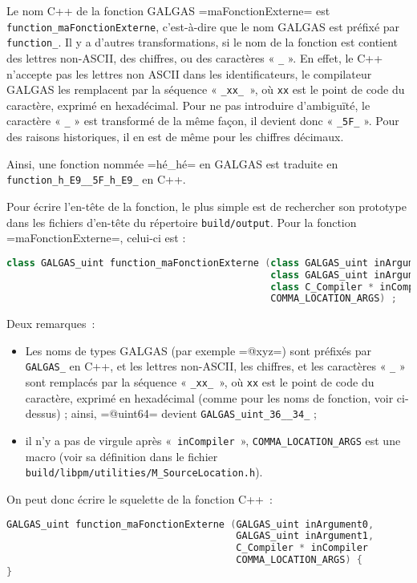 Le nom C++ de la fonction GALGAS \ggst=maFonctionExterne= est \texttt{function\_maFonctionExterne}, c'est-à-dire que le nom GALGAS est préfixé par \texttt{function\_}. Il y a d'autres transformations, si le nom de la fonction est contient des lettres non-ASCII, des chiffres, ou des caractères « \texttt{\_} ». En effet, le C++ n'accepte pas les lettres non ASCII dans les identificateurs, le compilateur GALGAS les remplacent par la séquence « \texttt{\_xx\_ }», où \texttt{xx} est le point de code du caractère, exprimé en hexadécimal. Pour ne pas introduire d'ambiguïté, le caractère « \texttt{\_} » est transformé de la même façon, il devient donc « \texttt{\_5F\_} ». Pour des raisons historiques, il en est de même pour les chiffres décimaux.

Ainsi, une fonction nommée \ggst=hé_hé= en GALGAS est traduite en \texttt{function\_h\_E9\_\_5F\_h\_E9\_} en C++.

Pour écrire l'en-tête de la fonction, le plus simple est de rechercher son prototype dans les fichiers d'en-tête du répertoire \texttt{build/output}. Pour la fonction \ggst=maFonctionExterne=, celui-ci est :

\begin{lstlisting}[language=C++]
class GALGAS_uint function_maFonctionExterne (class GALGAS_uint inArgument0,
                                              class GALGAS_uint inArgument1,
                                              class C_Compiler * inCompiler
                                              COMMA_LOCATION_ARGS) ;
\end{lstlisting}


Deux remarques~:
\begin{itemize}
  \item Les noms de types GALGAS (par exemple \ggst=@xyz=) sont préfixés par \texttt{GALGAS\_} en C++, et les lettres non-ASCII, les chiffres, et les caractères « \texttt{\_} »  sont remplacés par la séquence « \texttt{\_xx\_ }», où \texttt{xx} est le point de code du caractère, exprimé en hexadécimal (comme pour les noms de fonction, voir ci-dessus) ; ainsi, \ggst=@uint64= devient \texttt{GALGAS\_uint\_36\_\_34\_} ;
  \item il n'y a pas de virgule après «~\texttt{inCompiler}~», \texttt{COMMA\_LOCATION\_ARGS} est une macro (voir sa définition dans le fichier \texttt{build/libpm/utilities/M\_SourceLocation.h}).
\end{itemize}


On peut donc écrire le squelette de la fonction C++~:
\begin{lstlisting}[language=C++]
GALGAS_uint function_maFonctionExterne (GALGAS_uint inArgument0,
                                        GALGAS_uint inArgument1,
                                        C_Compiler * inCompiler
                                        COMMA_LOCATION_ARGS) {
}
\end{lstlisting}

